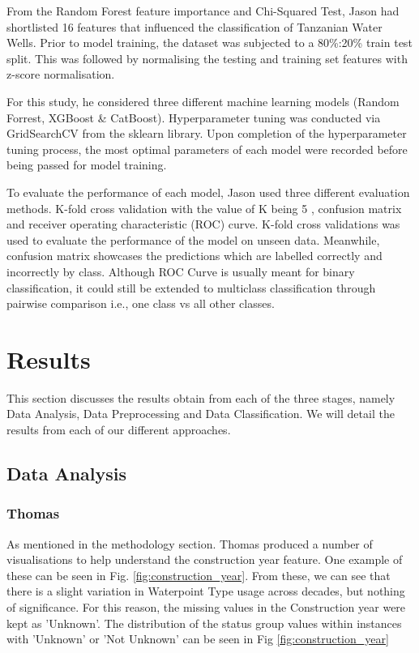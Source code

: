 \documentclass[conference]{IEEEtran}
\begin{document}
From the Random Forest feature importance and Chi-Squared Test, Jason had shortlisted 16 features that influenced the classification of Tanzanian Water Wells. Prior to model training, the dataset was subjected to a 80\%:20\% train test split. This was followed by normalising the testing and training set features with z-score normalisation.

For this study, he considered three different machine learning models  (Random Forrest, XGBoost \& CatBoost). Hyperparameter tuning was conducted via GridSearchCV \cite{gridsearch} from the sklearn library. Upon completion of the hyperparameter tuning process, the most optimal parameters of each model were recorded before being passed for model training. 

To evaluate the performance of each model, Jason used three different evaluation methods. K-fold cross validation with the value of K being 5 , confusion matrix and receiver operating characteristic (ROC) curve. K-fold cross validations was used to evaluate the performance of the model on unseen data. Meanwhile, confusion matrix showcases the predictions which are labelled correctly and incorrectly by class. Although ROC Curve is usually meant for binary classification, it could still be extended to multiclass classification through pairwise comparison i.e., one class vs all other classes.   

\section{Results} \label{ref:results}

This section discusses the results obtain from each of the three stages, namely Data Analysis, Data Preprocessing and Data Classification. We will detail the results from each of our different approaches.

\subsection{Data Analysis}

\subsubsection{Thomas}

As mentioned in the methodology section. Thomas produced a number of visualisations to help understand the construction year feature. One example of these can be seen in Fig. \ref{fig:construction_year}. From these, we can see that there is a slight variation in Waterpoint Type usage across decades, but nothing of significance. For this reason, the missing values in the Construction year were kept as 'Unknown'. The distribution of the status group values within instances with 'Unknown' or 'Not Unknown' can be seen in Fig \ref{fig:construction_year}
\end{document}
